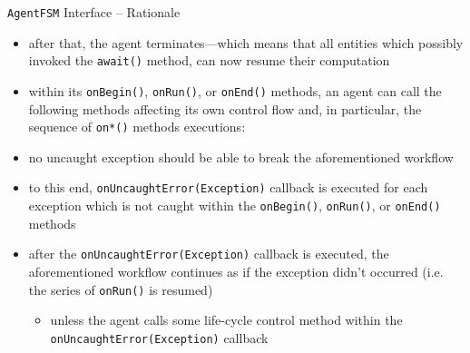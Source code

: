 \documentclass[presentation]{beamer}\mode<presentation>{\usetheme{AMSCesenaPurpleAndGold}}
\begin{document}
\begin{frame}[allowframebreaks]{\texttt{AgentFSM} Interface -- Rationale}
\begin{itemize}
        \item after that, the agent \alert{terminates}---which means that all entities which possibly invoked the \texttt{\alert{await()}} method, can now resume their computation
        
        \bigskip
        
        \item within its \texttt{onBegin()}, \texttt{onRun()}, or \texttt{onEnd()} methods, an agent can call the following methods affecting its own control flow and, in particular, the sequence of \texttt{on*()} methods executions:
        
        \framebreak
        
        \item \alert{no uncaught exception} should be able to break the aforementioned workflow
        
        \bigskip
        
        \item to this end, \texttt{\alert{onUncaughtError(Exception)}} callback is executed for each exception which is not caught within the \texttt{onBegin()}, \texttt{onRun()}, or \texttt{onEnd()} methods
        
        \bigskip
        
        \item after the \texttt{onUncaughtError(Exception)} callback is executed, the aforementioned workflow continues as if the exception didn't occurred (i.e. the series of \texttt{onRun()} is resumed)
        \begin{itemize}
            \item unless the agent calls some life-cycle control method within the \texttt{onUncaughtError(Exception)} callback
        \end{itemize}      
    \end{itemize}
\end{frame}
\end{document}
